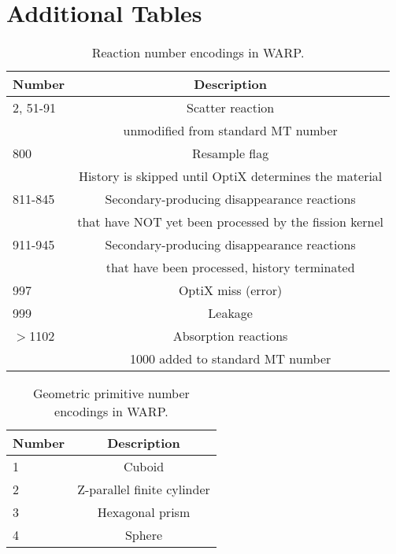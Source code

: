 \chapter{Additional Tables}


\begin{table}[h]
\centering
\caption{Reaction number encodings in WARP.}
\label{WARP_rxn_numbers}
\begin{tabular}{| l | c |}
\hline
Number &  Description \\
\hline
2, 51-91	  &   Scatter reaction \\
& unmodified from standard MT number  \\
\hline
800 &  Resample flag \\
&  History is skipped until OptiX determines the material \\
\hline
811-845 & Secondary-producing disappearance reactions \\
 & that have NOT yet been processed by the fission kernel \\
\hline
911-945 & Secondary-producing disappearance reactions \\
& that have been processed, history terminated \\
\hline
997	&  OptiX miss (error) \\
\hline
999	&   Leakage	\\
\hline
$>$1102 & Absorption reactions \\
& 1000 added to standard MT number\\
\hline
\end{tabular}
\end{table}

\begin{table}[h]
\centering
\caption{Geometric primitive number encodings in WARP.}
\label{WARP_geom_numbers}
\begin{tabular}{| l | c |}
\hline
Number &  Description \\
\hline
1	  &   Cuboid  \\
\hline
2 	&  Z-parallel finite cylinder \\
\hline
3	&   Hexagonal prism	\\
\hline
4     & Sphere \\
\hline
\end{tabular}
\end{table}


